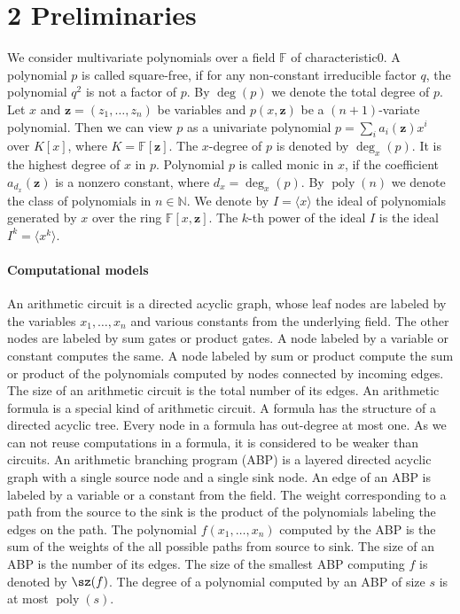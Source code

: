 \section*{2 Preliminaries}
We consider multivariate polynomials over a field $\mathbb F$ of characteristic0. A polynomial $p$ is called square-free, if for any non-constant irreducible factor $q$, the polynomial $q^2$ is not a factor of $p$.
By $\deg(p)$ we denote the total degree of $p$. Let $x$ and $\mathbf z=(z_1,\ldots,z_n)$ be variables and $p(x,\mathbf z)$ be a $(n+1)$-variate polynomial. Then we can view $p$ as a univariate polynomial $p=\sum_i a_i(\mathbf z)x^i$ over $K[x]$, where $K=\mathbb F[\mathbf z]$. The $x$-degree of $p$ is denoted by $\deg_x(p)$. It is the highest degree of $x$ in $p$. Polynomial $p$ is called monic in $x$, if the coefficient $a_{d_x}(\mathbf z)$ is a nonzero constant, where $d_x=\deg_x(p)$.
By $\operatorname{poly}(n)$ we denote the class of polynomials in $n\in\mathbb N$. We denote by $I=\langle x\rangle$ the ideal of polynomials generated by $x$ over the ring $\mathbb F[x,\mathbf z]$. The $k$-th power of the ideal $I$ is the ideal $I^k=\langle x^k\rangle$.
\paragraph{Computational models}
An arithmetic circuit is a directed acyclic graph, whose leaf nodes are labeled by the variables $x_1,\ldots,x_n$ and various constants from the underlying field. The other nodes are labeled by sum gates or product gates. A node labeled by a variable or constant computes the same. A node labeled by sum or product compute the sum or product of the polynomials computed by nodes connected by incoming edges. The size of an arithmetic circuit is the total number of its edges.
An arithmetic formula is a special kind of arithmetic circuit. A formula has the structure of a directed acyclic tree. Every node in a formula has out-degree at most one. As we can not reuse computations in a formula, it is considered to be weaker than circuits.
An arithmetic branching program (ABP) is a layered directed acyclic graph with a single source node and a single sink node. An edge of an ABP is labeled by a variable or a constant from the field. The weight corresponding to a path from the source to the sink is the product of the polynomials labeling the edges on the path. The polynomial $f(x_1,\ldots,x_n)$ computed by the ABP is the sum of the weights of the all possible paths from source to sink.
The size of an ABP is the number of its edges. The size of the smallest ABP computing $f$ is denoted by $\sz(f)$. The degree of a polynomial computed by an ABP of size $s$ is at most $\operatorname{poly}(s)$.
